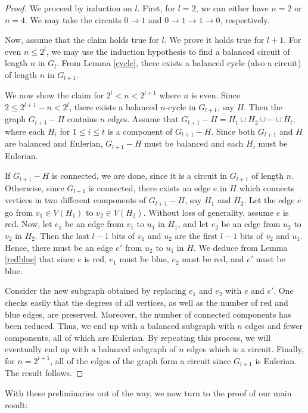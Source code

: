 \documentclass{article}
\theoremstyle{plain}
\theoremstyle{definition}
\theoremstyle{remark}
\begin{document}
\begin{proof}
We proceed by induction on $l$. First, for $l=2$, we can either have $n=2$ or $n=4$. We may take the circuits $0 \to 1$ and $0 \to 1 \to 1 \to 0$, respectively. 

Now, assume that the claim holds true for $l$. We prove it holds true for $l+1$. For even $n \leqslant 2^l$, we may use the induction hypothesis to find a balanced circuit of length $n$ in $G_l$. From Lemma \ref{cycle}, there exists a balanced cycle (also a circuit) of length $n$ in $G_{l+1}$. 

We now show the claim for $2^l < n < 2^{l+1}$ where $n$ is even. Since $2 \leqslant 2^{l+1}-n < 2^l$, there exists a balanced $n$-cycle in $G_{l+1}$, say $H$. Then the graph $G_{l+1}-H$ contains $n$ edges. Assume that $G_{l+1}-H = H_1 \cup H_2 \cup \cdots \cup H_t$, where each $H_i$ for $1 \leqslant i \leqslant t$ is a component of $G_{l+1}-H$. Since both $G_{l+1}$ and $H$ are balanced and Eulerian, $G_{l+1}-H$ must be balanced and each $H_i$ must be Eulerian.

If $G_{l+1}-H$ is connected, we are done, since it is a circuit in $G_{l+1}$ of length $n$. Otherwise, since $G_{l+1}$ is connected, there exists an edge $e$ in $H$ which connects vertices in two different components of $G_{l+1}-H$, say $H_1$ and $H_2$. Let the edge $e$ go from $v_1 \in V(H_1)$ to $v_2 \in V(H_2)$. Without loss of generality, assume $e$ is red. Now, let $e_1$ be an edge from $v_1$ to $u_1$ in $H_1$, and let $e_2$ be an edge from $u_2$ to $v_2$ in $H_2$. Then the last $l-1$ bits of $v_1$ and $u_2$ are the first $l-1$ bits of $v_2$ and $u_1$. Hence, there must be an edge $e'$ from $u_2$ to $u_1$ in $H$. We deduce from Lemma \ref{redblue} that since $e$ is red, $e_1$ must be blue, $e_2$ must be red, and $e'$ must be blue.

Consider the new subgraph obtained by replacing $e_1$ and $e_2$ with $e$ and $e'$. One checks easily that the degrees of all vertices, as well as the number of red and blue edges, are preserved. Moreover, the number of connected components has been reduced. Thus, we end up with a balanced subgraph with $n$ edges and fewer components, all of which are Eulerian. By repeating this process, we will eventually end up with a balanced subgraph of $n$ edges which is a circuit. Finally, for $n=2^{l+1}$, all of the edges of the graph form a circuit since $G_{l+1}$ is Eulerian. The result follows.
\end{proof}

With these preliminaries out of the way, we now turn to the proof of our main result:
\end{document}
